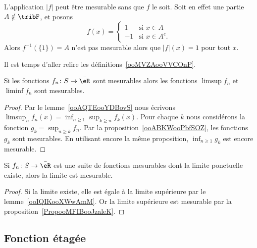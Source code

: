 \begin{remark}
	L'application \( | f |\) peut être mesurable sans que \( f\) le soit. Soit en effet une partie \( A\notin \tribF\), et posons
	\begin{equation}
		f(x)=\begin{cases}
			1  & \text{si } x\in A    \\
			-1 & \text{si } x\in A^c.
		\end{cases}
	\end{equation}
	Alors \( f^{-1}(\{ 1 \})=A\) n'est pas mesurable alors que \( | f |(x)=1\) pour tout \( x\).
\end{remark}

Il est temps d'aller relire les définitions~\ref{ooMVZAooVVCOnP}.

\begin{proposition}     \label{PropooMFIBooJzaleK}
	Si les fonctions \( f_n\colon S\to \bar \eR\) sont mesurables alors les fonctions \( \limsup f_n\) et \( \liminf f_n\) sont mesurables.
\end{proposition}

\begin{proof}
	Par le lemme~\ref{ooAQTEooYDBovS} nous écrivons \( \limsup_nf_n(x)=\inf_{n\geq 1}\sup_{k\geq n} f_k(x)\). Pour chaque \( k\) nous considérons la fonction \( g_k=\sup_{n\geq k}f_n\). Par la proposition~\ref{ooABKWooPbfSOZ}, les fonctions \( g_k\) sont mesurables. En utilisant encore la même proposition, \( \inf_{n\geq 1}g_k\) est encore mesurable.
\end{proof}

\begin{proposition}      \label{PropooDXBGooSFqrai}
	Si \( f_n\colon S\to \bar \eR\) est une suite de fonctions mesurables dont la limite ponctuelle existe, alors la limite est mesurable.
\end{proposition}

\begin{proof}
	Si la limite existe, elle est égale à la limite supérieure par le lemme~\ref{ooIQIKooXWwAmM}. Or la limite supérieure est mesurable par la proposition~\ref{PropooMFIBooJzaleK}.
\end{proof}

\subsection{Fonction étagée}

